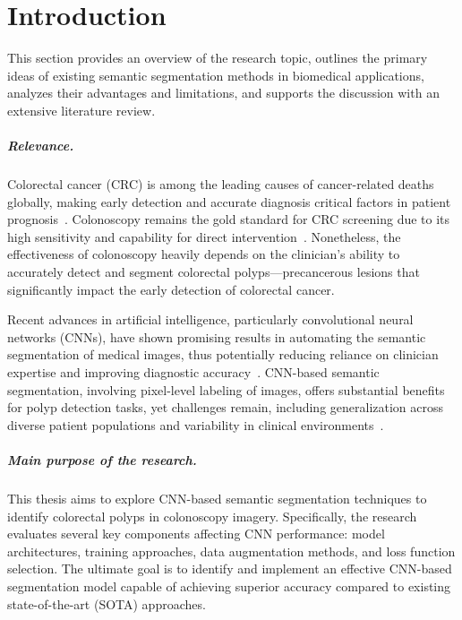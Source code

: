 \chapter{Introduction}

This section provides an overview of the research topic, outlines the primary ideas of existing semantic segmentation methods in biomedical applications, analyzes their advantages and limitations, and supports the discussion with an extensive literature review.

\paragraph{Relevance.}
Colorectal cancer (CRC) is among the leading causes of cancer-related deaths globally, making early detection and accurate diagnosis critical factors in patient prognosis~\cite{siegel2020cancer}. Colonoscopy remains the gold standard for CRC screening due to its high sensitivity and capability for direct intervention~\cite{rex2015colonoscopy}. Nonetheless, the effectiveness of colonoscopy heavily depends on the clinician's ability to accurately detect and segment colorectal polyps—precancerous lesions that significantly impact the early detection of colorectal cancer.

Recent advances in artificial intelligence, particularly convolutional neural networks (CNNs), have shown promising results in automating the semantic segmentation of medical images, thus potentially reducing reliance on clinician expertise and improving diagnostic accuracy~\cite{ronneberger2015u}. CNN-based semantic segmentation, involving pixel-level labeling of images, offers substantial benefits for polyp detection tasks, yet challenges remain, including generalization across diverse patient populations and variability in clinical environments~\cite{fan2020pranet}.

\paragraph{Main purpose of the research.}
This thesis aims to explore CNN-based semantic segmentation techniques to identify colorectal polyps in colonoscopy imagery. Specifically, the research evaluates several key components affecting CNN performance: model architectures, training approaches, data augmentation methods, and loss function selection. The ultimate goal is to identify and implement an effective CNN-based segmentation model capable of achieving superior accuracy compared to existing state-of-the-art (SOTA) approaches.

